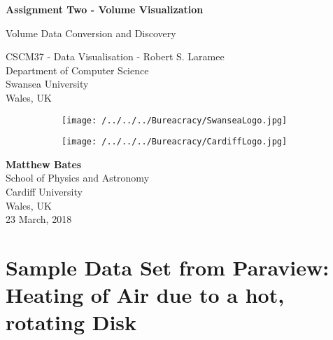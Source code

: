 \documentclass{article}
\author{Matthew Bates}
\begin{document}
\begin{titlepage}
    \begin{center}
        \vspace*{1cm}
        
	\Huge
        \textbf{Assignment Two - Volume Visualization}
        
        \vspace{0.5cm}
	\LARGE
        Volume Data Conversion and Discovery
         \vfill

	CSCM37 - Data Visualisation - Robert S. Laramee\\
	Department of Computer Science\\
	Swansea University\\
 	Wales, UK
        \vspace{1.5cm}
	\begin{figure}[h]
    		\centering
    		\begin{subfigure}[b]{0.3\textwidth}
        		\texttt{[image: /../../../Bureacracy/SwanseaLogo.jpg]}
    		\end{subfigure}
		\begin{subfigure}[b]{0.215\textwidth}
        		\texttt{[image: /../../../Bureacracy/CardiffLogo.jpg]}
        	\end{subfigure}
	\end{figure}
        

        
        \vspace{0.8cm}
        \Large
        \textbf{Matthew Bates}\\
        School of Physics and Astronomy\\
        Cardiff University\\
        Wales, UK\\
        23 March, 2018
        
    \end{center}
\end{titlepage}


\section{Sample Data Set from Paraview: Heating of Air due to a hot, rotating Disk}
\end{document}
